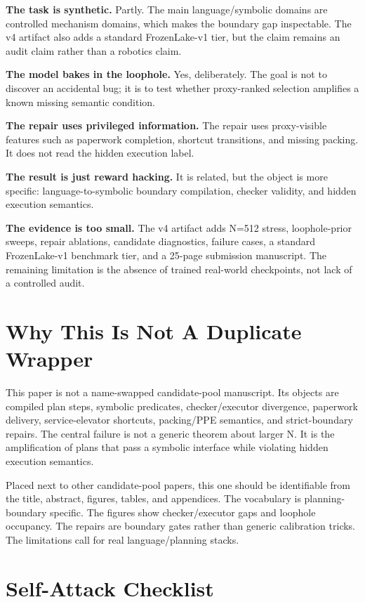 \documentclass{article}
\begin{document}
\textbf{The task is synthetic.} Partly. The main language/symbolic domains are
controlled mechanism domains, which makes the boundary gap inspectable. The v4
artifact also adds a standard FrozenLake-v1 tier, but the claim remains an
audit claim rather than a robotics claim.

\textbf{The model bakes in the loophole.} Yes, deliberately. The goal is not to
discover an accidental bug; it is to test whether proxy-ranked selection
amplifies a known missing semantic condition.

\textbf{The repair uses privileged information.} The repair uses proxy-visible
features such as paperwork completion, shortcut transitions, and missing
packing. It does not read the hidden execution label.

\textbf{The result is just reward hacking.} It is related, but the object is
more specific: language-to-symbolic boundary compilation, checker validity,
and hidden execution semantics.

\textbf{The evidence is too small.} The v4 artifact adds N=512 stress,
loophole-prior sweeps, repair ablations, candidate diagnostics, failure cases,
a standard FrozenLake-v1 benchmark tier, and a 25-page submission manuscript.
The remaining limitation is the absence of trained real-world checkpoints, not
lack of a controlled audit.

\section{Why This Is Not A Duplicate Wrapper}

This paper is not a name-swapped candidate-pool manuscript. Its objects are
compiled plan steps, symbolic predicates, checker/executor divergence,
paperwork delivery, service-elevator shortcuts, packing/PPE semantics, and
strict-boundary repairs. The central failure is not a generic theorem about
larger N. It is the amplification of plans that pass a symbolic interface while
violating hidden execution semantics.

Placed next to other candidate-pool papers, this one should be identifiable
from the title, abstract, figures, tables, and appendices. The vocabulary is
planning-boundary specific. The figures show checker/executor gaps and
loophole occupancy. The repairs are boundary gates rather than generic
calibration tricks. The limitations call for real language/planning stacks.

\section{Self-Attack Checklist}
\end{document}
